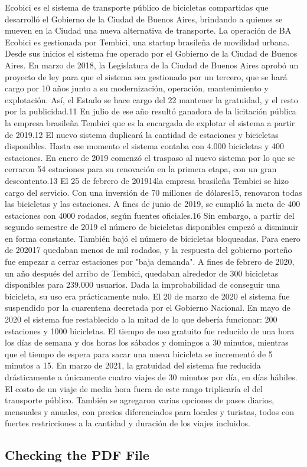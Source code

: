 \documentclass[runningheads,a4paper,spanish]{llncs}
\begin{document}
Ecobici es el sistema de transporte público de
bicicletas compartidas que desarrolló el Gobierno de
la Ciudad de Buenos Aires, brindando a quienes se
mueven en la Ciudad una nueva alternativa de
transporte.  La operación de BA Ecobici es gestionada
por Tembici, una startup brasileña de movilidad
urbana.
Desde sus inicios el sistema fue operado por el
Gobierno de la Ciudad de Buenos Aires.  En marzo de
2018, la Legislatura de la Ciudad de Buenos Aires
aprobó un proyecto de ley para que el sistema sea
gestionado por un tercero, que se hará cargo por 10
años junto a su modernización, operación,
mantenimiento y explotación. Así, el Estado se hace
cargo del 22%
mantener la gratuidad, y el resto por la
publicidad.11 En julio de ese año resultó
ganadora de la licitación pública la empresa brasileña
Tembici que es la encargada de explotar el sistema a
partir de 2019.12 El nuevo sistema duplicará la
cantidad de estaciones y bicicletas disponibles.
Hasta ese momento el sistema contaba con 4.000
bicicletas y 400 estaciones.  En enero de 2019 comenzó
el traspaso al nuevo sistema por lo que se cerraron 54
estaciones para su renovación en la primera etapa, con
un gran descontento.13 El 25 de febrero de
201914la empresa brasileña Tembici se hizo cargo
del servicio. Con una inversión de 70 millones de
dólares15, renovaron todas las bicicletas y las
estaciones.  A fines de junio de 2019, se cumplió la
meta de 400 estaciones con 4000 rodados, según fuentes
oficiales.16 Sin embargo, a partir del segundo
semestre de 2019 el número de bicicletas disponibles
empezó a disminuir en forma constante. También bajó el
número de bicicletas bloqueadas. Para enero de
202017 quedaban menos de mil rodados, y la
respuesta del gobierno porteño fue empezar a cerrar
estaciones por "baja demanda".  A fines de febrero de
2020, un año después del arribo de Tembici, quedaban
alrededor de 300 bicicletas disponibles para 239.000
usuarios. Dada la improbabilidad de conseguir una
bicicleta, su uso era prácticamente nulo.  El 20 de
marzo de 2020 el sistema fue suspendido por la
cuarentena decretada por el Gobierno Nacional.  En
mayo de 2020 el sistema fue restablecido a la mitad de
lo que debería funcionar: 200 estaciones y 1000
bicicletas. El tiempo de uso gratuito fue reducido de
una hora los días de semana y dos horas los sábados y
domingos a 30 minutos, mientras que el tiempo de
espera para sacar una nueva bicicleta se incrementó de
5 minutos a 15.  En marzo de 2021, la gratuidad del
sistema fue reducida drásticamente a únicamente cuatro
viajes de 30 minutos por día, en días hábiles. El
costo de un viaje de media hora fuera de este rango
triplicaría el del transporte público. También se
agregaron varias opciones de pases diarios, mensuales
y anuales, con precios diferenciados para locales y
turistas, todos con fuertes restricciones a la
cantidad y duración de los viajes incluidos. 

\subsection{Checking the PDF File}


\newpage


\end{document}
